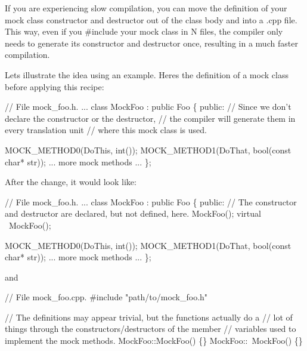 If you are experiencing slow compilation, you can move the definition of your mock class\textquotesingle{} constructor and destructor out of the class body and into a {\ttfamily .cpp} file. This way, even if you {\ttfamily \#include} your mock class in N files, the compiler only needs to generate its constructor and destructor once, resulting in a much faster compilation.

Let\textquotesingle{}s illustrate the idea using an example. Here\textquotesingle{}s the definition of a mock class before applying this recipe\+:


\begin{DoxyCode}
\textcolor{comment}{// File mock\_foo.h.}
...
class MockFoo : \textcolor{keyword}{public} Foo \{
 \textcolor{keyword}{public}:
  \textcolor{comment}{// Since we don't declare the constructor or the destructor,}
  \textcolor{comment}{// the compiler will generate them in every translation unit}
  \textcolor{comment}{// where this mock class is used.}

  MOCK\_METHOD0(DoThis, \textcolor{keywordtype}{int}());
  MOCK\_METHOD1(DoThat, \textcolor{keywordtype}{bool}(\textcolor{keyword}{const} \textcolor{keywordtype}{char}* str));
  ... more mock methods ...
\};
\end{DoxyCode}


After the change, it would look like\+:


\begin{DoxyCode}
\textcolor{comment}{// File mock\_foo.h.}
...
class MockFoo : \textcolor{keyword}{public} Foo \{
 \textcolor{keyword}{public}:
  \textcolor{comment}{// The constructor and destructor are declared, but not defined, here.}
  MockFoo();
  \textcolor{keyword}{virtual} ~MockFoo();

  MOCK\_METHOD0(DoThis, \textcolor{keywordtype}{int}());
  MOCK\_METHOD1(DoThat, \textcolor{keywordtype}{bool}(\textcolor{keyword}{const} \textcolor{keywordtype}{char}* str));
  ... more mock methods ...
\};
\end{DoxyCode}
 and 
\begin{DoxyCode}
\textcolor{comment}{// File mock\_foo.cpp.}
\textcolor{preprocessor}{#include "path/to/mock\_foo.h"}

\textcolor{comment}{// The definitions may appear trivial, but the functions actually do a}
\textcolor{comment}{// lot of things through the constructors/destructors of the member}
\textcolor{comment}{// variables used to implement the mock methods.}
MockFoo::MockFoo() \{\}
MockFoo::~MockFoo() \{\}
\end{DoxyCode}


